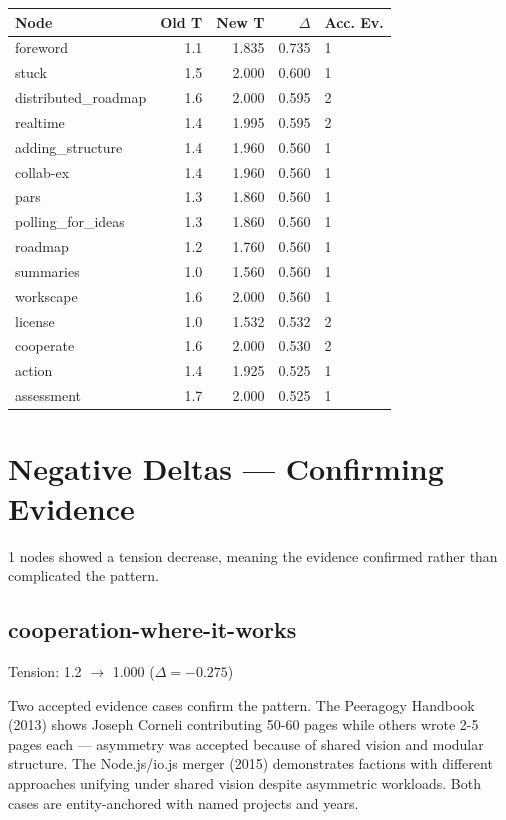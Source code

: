 \documentclass[11pt,a4paper]{article}
\begin{document}
\begin{longtable}{lrrrl}
\toprule
Node & Old T & New T & $\Delta$ & Acc. Ev. \\
\midrule
\endhead
foreword & 1.1 & 1.835 & 0.735 & 1 \\
stuck & 1.5 & 2.000 & 0.600 & 1 \\
distributed\_roadmap & 1.6 & 2.000 & 0.595 & 2 \\
realtime & 1.4 & 1.995 & 0.595 & 2 \\
adding\_structure & 1.4 & 1.960 & 0.560 & 1 \\
collab-ex & 1.4 & 1.960 & 0.560 & 1 \\
pars & 1.3 & 1.860 & 0.560 & 1 \\
polling\_for\_ideas & 1.3 & 1.860 & 0.560 & 1 \\
roadmap & 1.2 & 1.760 & 0.560 & 1 \\
summaries & 1.0 & 1.560 & 0.560 & 1 \\
workscape & 1.6 & 2.000 & 0.560 & 1 \\
license & 1.0 & 1.532 & 0.532 & 2 \\
cooperate & 1.6 & 2.000 & 0.530 & 2 \\
action & 1.4 & 1.925 & 0.525 & 1 \\
assessment & 1.7 & 2.000 & 0.525 & 1 \\
\bottomrule
\end{longtable}

\section{Negative Deltas — Confirming Evidence}
1 nodes showed a tension decrease, meaning the evidence confirmed rather than complicated the pattern.

\subsection{cooperation-where-it-works}
Tension: 1.2 $\rightarrow$ 1.000 ($\Delta = -0.275$)

Two accepted evidence cases confirm the pattern. The Peeragogy Handbook (2013) shows Joseph Corneli contributing 50-60 pages while others wrote 2-5 pages each — asymmetry was accepted because of shared vision and modular structure. The Node.js/io.js merger (2015) demonstrates factions with different approaches unifying under shared vision despite asymmetric workloads. Both cases are entity-anchored with named projects and years.
\end{document}

